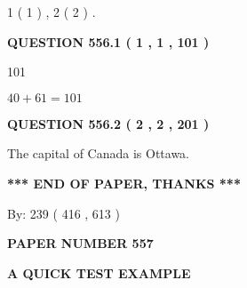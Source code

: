 \documentclass[12pt]{article}
\begin{document}
   
   1 ( 1 )
 ,
   2 ( 2 )
 .
  
\vspace{0.2in}
  
{\textbf{\Large{QUESTION
556.1 
 ( 1 , 1 , 101 )
}}}
  
  
 
 
\noindent{}

101
 
 
 
 
\noindent{}

$ %
40 +  %
61=   %
101$
 
 
  
\vspace{0.2in}
  
{\textbf{\Large{QUESTION
556.2 
 ( 2 , 2 , 201 )
}}}
  
  
 
 
\noindent{}
 
 
The capital of Canada is Ottawa.
 
 
 
 
   
   
 \vspace{0.2in}
 
   
   
   
   
\vspace{1.0in} 
{\textbf{\large{ *** END OF PAPER, THANKS *** }}} 
   
   
\hspace{1.0in} By: 
 239 ( 416 ,  613 )
   
   
   
   
\newpage 
\setcounter{page}{ 
   557001 } 
   
   
   
   
 {\textbf{ \Large{ PAPER NUMBER  557  }}}
   
   
\vspace{0.2in}
   
   
   
   
   
   
 \vspace{0.2in}
{\LARGE {\textbf{ A QUICK TEST EXAMPLE}}}
   
\end{document}
